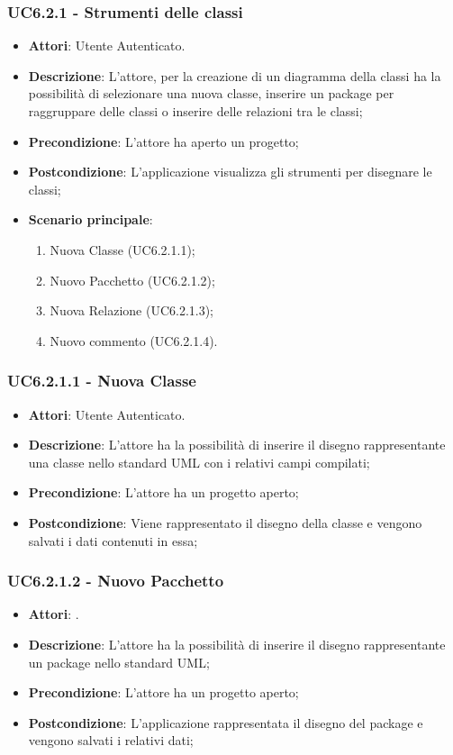 \subsubsection{UC6.2.1 - Strumenti delle classi} 
\label{sssec:UC6.2.1} 
\begin{itemize} 
\item \textbf{Attori}: Utente Autenticato.
\item \textbf{Descrizione}: L'attore, per la creazione di un diagramma della classi ha la possibilità di selezionare una nuova classe, inserire un package per raggruppare delle classi o inserire delle relazioni tra le classi;
\item \textbf{Precondizione}: L'attore ha aperto un progetto;
\item \textbf{Postcondizione}: L'applicazione visualizza gli strumenti per disegnare le classi;
\item \textbf{Scenario principale}: \begin{enumerate}\item Nuova Classe (UC6.2.1.1);\item Nuovo Pacchetto (UC6.2.1.2);\item Nuova Relazione (UC6.2.1.3);\item Nuovo commento (UC6.2.1.4). 
 \end{enumerate}
\end{itemize} 
\subsubsection{UC6.2.1.1 - Nuova Classe} 
\label{sssec:UC6.2.1.1} 
\begin{itemize} 
\item \textbf{Attori}: Utente Autenticato.
\item \textbf{Descrizione}: L'attore ha la possibilità di inserire il disegno rappresentante una classe nello standard UML con i relativi campi compilati;
\item \textbf{Precondizione}: L'attore ha un progetto aperto;
\item \textbf{Postcondizione}: Viene rappresentato il disegno della classe e vengono salvati i dati contenuti in essa;
\end{itemize} 
\subsubsection{UC6.2.1.2 - Nuovo Pacchetto} 
\label{sssec:UC6.2.1.2} 
\begin{itemize} 
\item \textbf{Attori}: .
\item \textbf{Descrizione}: L'attore ha la possibilità di inserire il disegno rappresentante un package nello standard UML;
\item \textbf{Precondizione}: L'attore ha un progetto aperto;
\item \textbf{Postcondizione}: L'applicazione rappresentata il disegno del package e vengono salvati i relativi dati;
\end{itemize} 
